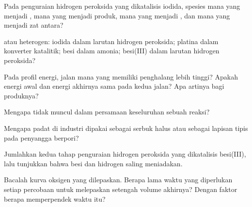 \begin{exercise}[$\star$]\label{exo:g12:catalysis:1}
Pada penguraian hidrogen peroksida yang dikatalisis  iodida, spesies
mana yang menjadi , mana yang menjadi produk, mana yang menjadi
, dan mana yang menjadi zat antara?
\end{exercise}

\begin{exercise}[$\star$]\label{exo:g12:catalysis:2}
 atau heterogen:  iodida dalam larutan hidrogen
peroksida; platina dalam konverter katalitik; besi dalam 
amonia;  besi(III) dalam larutan hidrogen peroksida?
\end{exercise}

\begin{exercise}[$\star$]\label{exo:g12:catalysis:3}
Pada profil energi, jalan mana yang memiliki penghalang lebih tinggi?
Apakah energi awal dan energi akhirnya sama pada kedua jalan? Apa
artinya bagi produknya?
\end{exercise}

\begin{exercise}[$\star$]\label{exo:g12:catalysis:4}
Mengapa  tidak muncul dalam persamaan keseluruhan sebuah reaksi?
\end{exercise}

\begin{exercise}[$\star$]\label{exo:g12:catalysis:5}
Mengapa  padat di industri dipakai sebagai serbuk halus atau
sebagai lapisan tipis pada penyangga berpori?
\end{exercise}

\begin{exercise}[$\star\star$]\label{exo:g12:catalysis:6}
Jumlahkan kedua tahap penguraian hidrogen peroksida yang dikatalisis
besi(III), lalu tunjukkan bahwa  besi dan  hidrogen saling
meniadakan.
\end{exercise}

\begin{exercise}[$\star\star$]\label{exo:g12:catalysis:7}
Bacalah kurva oksigen yang dilepaskan. Berapa lama waktu yang
diperlukan setiap percobaan untuk melepaskan setengah volume akhirnya?
Dengan faktor berapa  memperpendek waktu itu?
\end{exercise}

